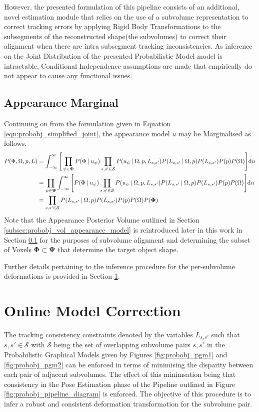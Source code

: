However, the presented formulation of this pipeline consists of an
additional, novel estimation module that relies on the use of a subvolume
representation to correct tracking errors by applying Rigid Body Transformations
to the subsegments of the reconstructed shape(the subvolumes) to correct their
alignment when there are intra subsegment tracking inconsistencies. As inference
on the Joint Distribution of the presented Probabilistic Model model is
intractable, Conditional Independence assumptions are made that empirically do
not appear to cause any functional issues.

\subsection{Appearance Marginal}
Continuing on from the formulation given in Equation
\ref{eqn:probobj_simplified_joint}, the appearance model $u$ may be Marginalised
as follows.
\begin{align}
  \label{eqn:probobj_appearanc_marginal}
  P(\Phi, \Omega, p, L) & =
  \int_{-\infty}^{\infty} \Bigg[ 
  \prod_{\psi \in \mathbf{\Psi}} P(\Phi \:\vert\: u_{\psi})
  \prod_{s, s' \in \mathcal{S}}P(u_{\psi} \:\vert\: \Omega, p, L_{s, s'})
  P(L_{s, s'} \:\vert\: \Omega, p) P(L_{s, s'})P(p)P(\Omega) \Bigg] {\mathrm d{u}} \\
  & = \prod_{\psi \in \mathbf{\Psi}} 
  \int_{-\infty}^{\infty} \Bigg[ P(\Phi \:\vert\: u_{\psi})
  \prod_{s, s' \in \mathcal{S}}P(u_{\psi} \:\vert\: \Omega, p, L_{s, s'})
  P(L_{s, s'} \:\vert\: \Omega, p) P(L_{s, s'})P(p)P(\Omega) \Bigg] {\mathrm d{u}} \\
  & = \prod_{s, s' \in \mathcal{S}} P(L_{s, s'} \:\vert\: \Omega, p)
  P(L_{s, s'})P(p)P(\Omega)P(\mathbf{\Phi})
\end{align}
Note that the Appearance Posterior Volume outlined in Section 
\ref{subsec:probobj_vol_appearance_model} is reintroduced later in this work in
Section \ref{} for the purposes of subvolume alignment and determining the
subset of Voxels $\mathbf{\Phi} \subset \mathbf{\Psi}$ that determine the target
object shape.

Further details pertaining to the inference procedure for the per-subvolume
deformations is provided in Section \ref{sec:probobj_model_correction}.

\section{Online Model Correction}
\label{sec:probobj_model_correction}
The tracking consistency constraints denoted by the variables $L_{s, s'}$ such
that $s, s' \in \mathcal{S}$ with $\mathcal{S}$ being the set of overlapping
subvolume pairs $s, s'$ in the Probabilistic Graphical Models given by Figures
\ref{fig:probobj_pgm1} and \ref{fig:probobj_pgm2} can be enforced in terms of
minimising the disparity between each pair of adjacent subvolumes. The effect of
this minimsation being that consistency in the Pose Estimation phase of the
Pipeline outlined in Figure \ref{fig:probobj_pipeline_diagram} is enforced. The
objective of this procedure is to infer a robust and consistent deformation
transformation for the subvolume pair.

